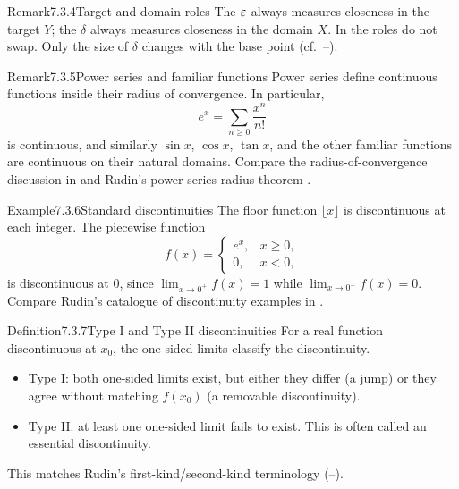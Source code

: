 \documentclass[main.tex]{subfiles}
\begin{document}
\begin{ObjL}{Remark}{7.3.4}{Target and domain roles}
The $\varepsilon$ always measures closeness in the target $Y$; the $\delta$ always measures closeness in
the domain $X$. In  the roles do not swap. Only the size of $\delta$ changes with the
base point (cf.\ --).
\end{ObjL}

\begin{ObjL}{Remark}{7.3.5}{Power series and familiar functions}
Power series define continuous functions inside their radius of convergence. In particular,
\[
  e^x=\sum_{n\ge0}\frac{x^n}{n!}
\]
is continuous, and similarly $\sin x$, $\cos x$, $\tan x$, and the other familiar functions are
continuous on their natural domains. Compare the radius-of-convergence discussion in
 and Rudin's power-series radius theorem .
\end{ObjL}

\begin{ObjL}{Example}{7.3.6}{Standard discontinuities}
The floor function $\lfloor x\rfloor$ is discontinuous at each integer. The piecewise function
\[
  f(x)=
  \begin{cases}
    e^x, & x\ge0,\\
    0, & x<0,
  \end{cases}
\]
is discontinuous at $0$, since $\lim_{x\to0^+}f(x)=1$ while $\lim_{x\to0^-}f(x)=0$.
Compare Rudin's catalogue of discontinuity examples in .
\end{ObjL}

\begin{Obj}{Definition}{7.3.7}{Type I and Type II discontinuities}
For a real function discontinuous at $x_0$, the one-sided limits classify the discontinuity.
\begin{itemize}[leftmargin=1.3em,topsep=2pt,itemsep=1pt,label=\textbullet]
  \item Type I: both one-sided limits exist, but either they differ (a jump) or they agree
        without matching $f(x_0)$ (a removable discontinuity).
  \item Type II: at least one one-sided limit fails to exist. This is often called an
        essential discontinuity.
\end{itemize}
This matches Rudin's first-kind/second-kind terminology (--).
\end{Obj}
\end{document}
